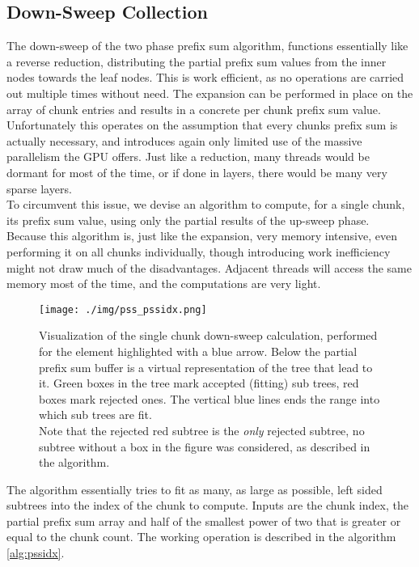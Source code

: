 \documentclass{tudscrreprt}
\begin{document}
			\subsection{Down-Sweep Collection}
				\label{sec:analysis_pss_down_sweep}
				The down-sweep of the two phase prefix sum algorithm, functions essentially like a reverse reduction, distributing the partial prefix sum values from the inner nodes towards the leaf nodes. This is work efficient, as no operations are carried out multiple times without need. The expansion can be performed in place on the array of chunk entries and results in a concrete per chunk prefix sum value. \\
				Unfortunately this operates on the assumption that every chunks prefix sum is actually necessary, and introduces again only limited use of the massive parallelism the GPU offers. Just like a reduction, many threads would be dormant for most of the time, or if done in layers, there would be many very sparse layers. \\
				
				To circumvent this issue, we devise an algorithm to compute, for a single chunk, its prefix sum value, using only the partial results of the up-sweep phase. \\
				Because this algorithm is, just like the expansion, very memory intensive, even performing it on all chunks individually, though introducing work inefficiency might not draw much of the disadvantages. Adjacent threads will access the same memory most of the time, and the computations are very light. \\
				
				\begin{figure}[!ht]
					\centering
					\texttt{[image: ./img/pss\_pssidx.png]}
					\caption{\label{fig:pss_pssidx}Visualization of the single chunk down-sweep calculation, performed for the element highlighted with a blue arrow. Below the partial prefix sum buffer is a virtual representation of the tree that lead to it. Green boxes in the tree mark accepted (fitting) sub trees, red boxes mark rejected ones. The vertical blue lines ends the range into which sub trees are fit. \\ Note that the rejected red subtree is the \emph{only} rejected subtree, no subtree without a box in the figure was considered, as described in the algorithm.}
				\end{figure}
			
				The algorithm essentially tries to fit as many, as large as possible, left sided subtrees into the index of the chunk to compute. Inputs are the chunk index, the partial prefix sum array and half of the smallest power of two that is greater or equal to the chunk count. The working operation is described in the algorithm \ref{alg:pssidx}. \\
				
\end{document}
